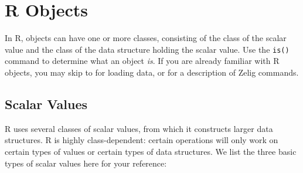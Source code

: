 \chapter{R Objects}\label{a:R}

In R, objects can have one or more classes, consisting of the class of
the scalar value and the class of the data structure holding the
scalar value.  Use the {\tt is()} command to determine what an object
\emph{is}.  If you are already familiar with R objects, you may skip
to  for loading data, or  for a
description of Zelig commands.

\section{Scalar Values}\label{variables}

R uses several classes of scalar values, from which it constructs 
larger data structures.  R is highly class-dependent: certain
operations will only work on certain types of values or certain types
of data structures.  We list the three basic types of scalar values
here for your reference:  

